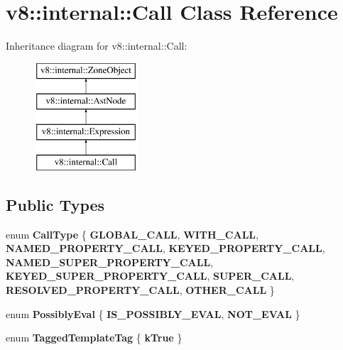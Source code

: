 \hypertarget{classv8_1_1internal_1_1Call}{}\section{v8\+:\+:internal\+:\+:Call Class Reference}
\label{classv8_1_1internal_1_1Call}
Inheritance diagram for v8\+:\+:internal\+:\+:Call\+:\begin{figure}[H]
\begin{center}
\leavevmode
\includegraphics[height=4.000000cm]{classv8_1_1internal_1_1Call}
\end{center}
\end{figure}
\subsection*{Public Types}
\begin{DoxyCompactItemize}
\item 
\mbox{\label{classv8_1_1internal_1_1Call_ac6d809a066023f5d0fae3545e3df4fce}} 
enum {\bfseries Call\+Type} \{ \newline
{\bfseries G\+L\+O\+B\+A\+L\+\_\+\+C\+A\+LL}, 
{\bfseries W\+I\+T\+H\+\_\+\+C\+A\+LL}, 
{\bfseries N\+A\+M\+E\+D\+\_\+\+P\+R\+O\+P\+E\+R\+T\+Y\+\_\+\+C\+A\+LL}, 
{\bfseries K\+E\+Y\+E\+D\+\_\+\+P\+R\+O\+P\+E\+R\+T\+Y\+\_\+\+C\+A\+LL}, 
\newline
{\bfseries N\+A\+M\+E\+D\+\_\+\+S\+U\+P\+E\+R\+\_\+\+P\+R\+O\+P\+E\+R\+T\+Y\+\_\+\+C\+A\+LL}, 
{\bfseries K\+E\+Y\+E\+D\+\_\+\+S\+U\+P\+E\+R\+\_\+\+P\+R\+O\+P\+E\+R\+T\+Y\+\_\+\+C\+A\+LL}, 
{\bfseries S\+U\+P\+E\+R\+\_\+\+C\+A\+LL}, 
{\bfseries R\+E\+S\+O\+L\+V\+E\+D\+\_\+\+P\+R\+O\+P\+E\+R\+T\+Y\+\_\+\+C\+A\+LL}, 
\newline
{\bfseries O\+T\+H\+E\+R\+\_\+\+C\+A\+LL}
 \}
\item 
\mbox{\label{classv8_1_1internal_1_1Call_a956989aff39b4c7c2692cbb2b070c6d6}} 
enum {\bfseries Possibly\+Eval} \{ {\bfseries I\+S\+\_\+\+P\+O\+S\+S\+I\+B\+L\+Y\+\_\+\+E\+V\+AL}, 
{\bfseries N\+O\+T\+\_\+\+E\+V\+AL}
 \}
\item 
\mbox{\label{classv8_1_1internal_1_1Call_a3ddebf0897ed6baa729e48a486e4146f}} 
enum {\bfseries Tagged\+Template\+Tag} \{ {\bfseries k\+True}
 \}
\end{DoxyCompactItemize}

